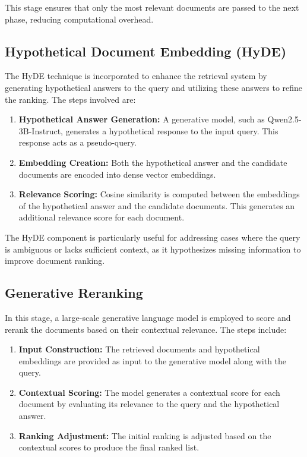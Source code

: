 This stage ensures that only the most relevant documents are passed to the next phase, reducing computational overhead.

\subsection{Hypothetical Document Embedding (HyDE)}
The HyDE technique is incorporated to enhance the retrieval system by generating hypothetical answers to the query and utilizing these answers to refine the ranking. The steps involved are:
\begin{enumerate}
    \item \textbf{Hypothetical Answer Generation:} A generative model, such as Qwen2.5-3B-Instruct\cite{qwen2.5}, generates a hypothetical response to the input query. This response acts as a pseudo-query.
    \item \textbf{Embedding Creation:} Both the hypothetical answer and the candidate documents are encoded into dense vector embeddings.
    \item \textbf{Relevance Scoring:} Cosine similarity is computed between the embeddings of the hypothetical answer and the candidate documents. This generates an additional relevance score for each document.
\end{enumerate}

The HyDE component is particularly useful for addressing cases where the query is ambiguous or lacks sufficient context, as it hypothesizes missing information to improve document ranking.

\subsection{Generative Reranking}
In this stage, a large-scale generative language model is employed to score and rerank the documents based on their contextual relevance. The steps include:
\begin{enumerate}
    \item \textbf{Input Construction:} The retrieved documents and hypothetical embeddings are provided as input to the generative model along with the query.
    \item \textbf{Contextual Scoring:} The model generates a contextual score for each document by evaluating its relevance to the query and the hypothetical answer.
    \item \textbf{Ranking Adjustment:} The initial ranking is adjusted based on the contextual scores to produce the final ranked list.
\end{enumerate}

